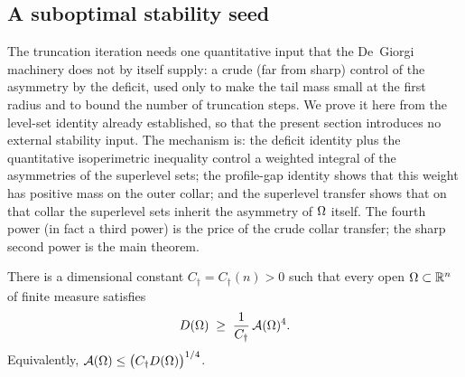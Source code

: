 \subsection{A suboptimal stability seed}\label{ssec:seed}

The truncation iteration needs one quantitative input that the De~Giorgi
machinery does not by itself supply: a crude (far from sharp) control of the
asymmetry by the deficit, used only to make the tail mass small at the first
radius and to bound the number of truncation steps. We prove it here from the
level-set identity already established, so that the present section introduces
no external stability input. The mechanism is: the deficit identity plus the
quantitative isoperimetric inequality control a weighted integral of the
asymmetries of the superlevel sets; the profile-gap identity shows that this
weight has positive mass on the outer collar; and the superlevel transfer
shows that on that collar the superlevel sets inherit the asymmetry of
$\Omega$ itself. The fourth power (in fact a third power) is the price of the
crude collar transfer; the sharp second power is the main theorem.

\begin{lemma}\label{lem:seed}
There is a dimensional constant $C_\dagger=C_\dagger(n)>0$ such that every
open $\Omega\subset\mathbb R^n$ of finite measure satisfies
\begin{equation}\label{eq:seed}
   D(\Omega)\;\ge\;\frac{1}{C_\dagger}\,\mathcal A(\Omega)^{4}.
\end{equation}
Equivalently, $\mathcal A(\Omega)\le\bigl(C_\dagger D(\Omega)\bigr)^{1/4}$.
\end{lemma}

